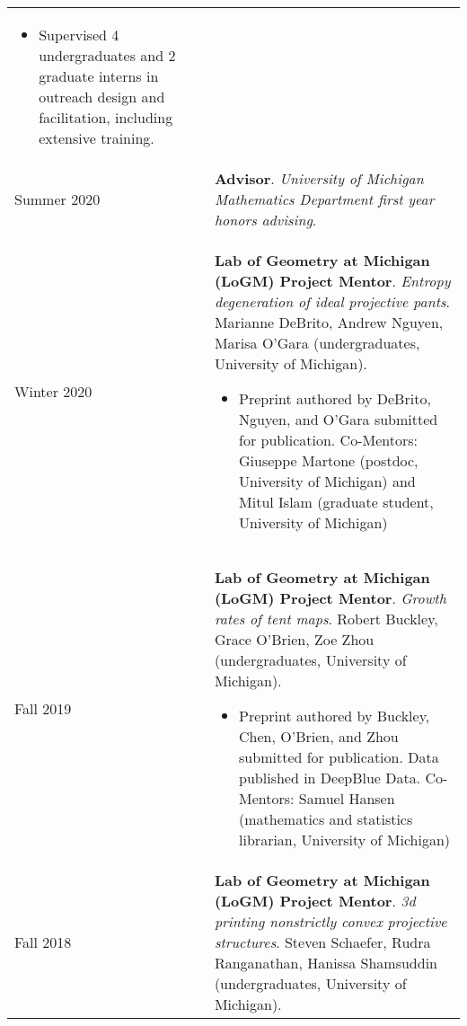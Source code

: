 \begin{center}
{\begin{longtable}{p{}  p{}}
        {\small
        \begin{itemize}
        \setlength{\parindent}{0em}
        \item[] Supervised 4 undergraduates and 2 graduate interns in outreach design and facilitation, including extensive training.
        \end{itemize}
        }
        \vspace{-1em}
         \\ 
  Summer 2020 & \textbf{Advisor}. \textit{University of Michigan Mathematics Department first year honors advising}.  \\ 
  Winter 2020 & \textbf{Lab of Geometry at Michigan (LoGM) Project Mentor}. \textit{Entropy degeneration of ideal projective pants}.  Marianne DeBrito, Andrew Nguyen, Marisa O'Gara (undergraduates, University of Michigan). 
        \hspace{-1em}

        {\small
        \begin{itemize}
        \setlength{\parindent}{0em}
        \item[] Preprint authored by DeBrito, Nguyen, and O'Gara submitted for publication.
            Co-Mentors: Giuseppe Martone (postdoc, University of Michigan) and Mitul Islam (graduate student, University of Michigan) 
        \end{itemize}
        }
        \vspace{-1em}
         \\ 
  Fall 2019 & \textbf{Lab of Geometry at Michigan (LoGM) Project Mentor}. \textit{Growth rates of tent maps}.  Robert Buckley, Grace O'Brien, Zoe Zhou (undergraduates, University of Michigan). 
        \hspace{-1em}

        {\small
        \begin{itemize}
        \setlength{\parindent}{0em}
        \item[] Preprint authored by Buckley, Chen, O'Brien, and Zhou submitted for publication. Data published in DeepBlue Data.
            Co-Mentors: Samuel Hansen (mathematics and statistics librarian, University of Michigan) 
        \end{itemize}
        }
        \vspace{-1em}
         \\ 
  Fall 2018 & \textbf{Lab of Geometry at Michigan (LoGM) Project Mentor}. \textit{3d printing nonstrictly convex projective structures}.  Steven Schaefer, Rudra Ranganathan, Hanissa Shamsuddin (undergraduates, University of Michigan). 
        \hspace{-1em}


\end{longtable}}
\end{center}
